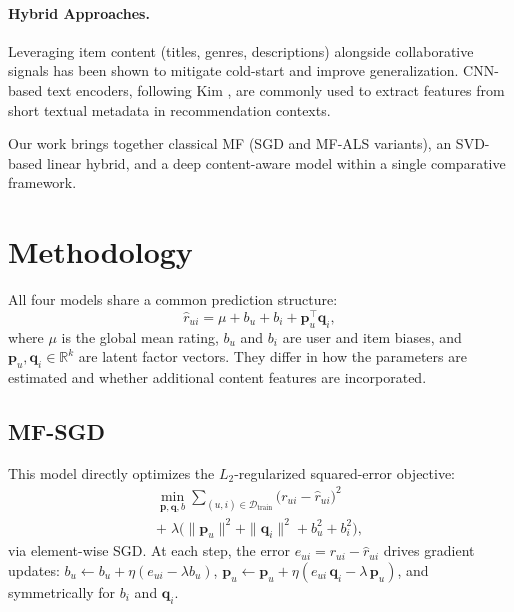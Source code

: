 \documentclass[11pt]{article}
\begin{document}
\paragraph{Hybrid Approaches.}
Leveraging item content (titles, genres, descriptions) alongside collaborative signals has been shown to mitigate cold-start and improve generalization.
CNN-based text encoders, following Kim \cite{kim2014convolutional}, are commonly used to extract features from short textual metadata in recommendation contexts.

Our work brings together classical MF (SGD and MF-ALS variants), an SVD-based linear hybrid, and a deep content-aware model within a single comparative framework.



\section{Methodology}

All four models share a common prediction structure:
\begin{equation}
\hat{r}_{ui} = \mu + b_u + b_i + \mathbf{p}_u^\top \mathbf{q}_i,
\label{eq:base}
\end{equation}
where $\mu$ is the global mean rating, $b_u$ and $b_i$ are user and item biases, and $\mathbf{p}_u,\mathbf{q}_i\in\mathbb{R}^k$ are latent factor vectors.
They differ in how the parameters are estimated and whether additional content features are incorporated.

\subsection{MF-SGD}

This model directly optimizes the $L_2$-regularized squared-error objective:
\begin{equation}
\begin{split}
\min_{\mathbf{p},\mathbf{q},b} \sum_{(u,i)\in\mathcal{D}_\text{train}} \!\!\bigl(r_{ui} - \hat{r}_{ui}\bigr)^2 \\
+\; \lambda\bigl(\|\mathbf{p}_u\|^2 + \|\mathbf{q}_i\|^2 + b_u^2 + b_i^2\bigr),
\end{split}
\label{eq:mfsgd}
\end{equation}
via element-wise SGD.
At each step, the error $e_{ui}=r_{ui}-\hat{r}_{ui}$ drives gradient updates:
$b_u \leftarrow b_u + \eta(e_{ui}-\lambda b_u)$,
$\mathbf{p}_u \leftarrow \mathbf{p}_u + \eta(e_{ui}\,\mathbf{q}_i - \lambda\,\mathbf{p}_u)$,
and symmetrically for $b_i$ and $\mathbf{q}_i$.
\end{document}
